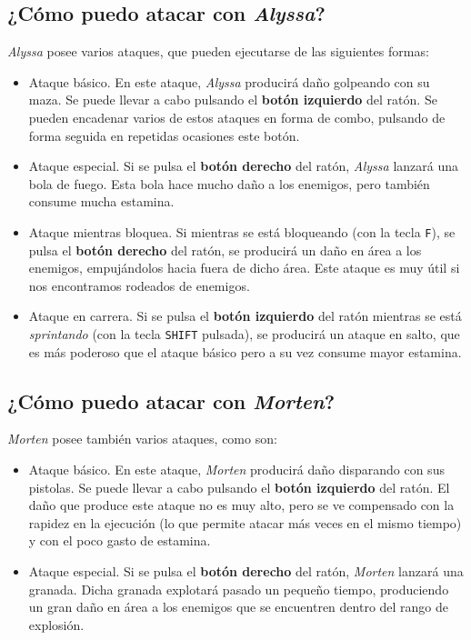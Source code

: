\subsection{¿Cómo puedo atacar con \textit{Alyssa}?}

\textit{Alyssa} posee varios ataques, que pueden ejecutarse de las siguientes formas:

\begin{itemize}
\item Ataque básico. En este ataque, \textit{Alyssa} producirá daño golpeando con su maza. Se puede llevar a cabo pulsando el \textbf{botón izquierdo} del ratón. Se pueden encadenar varios de estos ataques en forma de combo, pulsando de forma seguida en repetidas ocasiones este botón.
\item Ataque especial. Si se pulsa el \textbf{botón derecho} del ratón, \textit{Alyssa} lanzará una bola de fuego. Esta bola hace mucho daño a los enemigos, pero también consume mucha estamina.
\item Ataque mientras bloquea. Si mientras se está bloqueando (con la tecla \texttt{F}), se pulsa el \textbf{botón derecho} del ratón, se producirá un daño en área a los enemigos, empujándolos hacia fuera de dicho área. Este ataque es muy útil si nos encontramos rodeados de enemigos.
\item Ataque en carrera. Si se pulsa el \textbf{botón izquierdo} del ratón mientras se está \textit{sprintando} (con la tecla \texttt{SHIFT} pulsada), se producirá un ataque en salto, que es más poderoso que el ataque básico pero a su vez consume mayor estamina.
\end{itemize}

\subsection{¿Cómo puedo atacar con \textit{Morten}?}

\textit{Morten} posee también varios ataques, como son:

\begin{itemize}
\item Ataque básico. En este ataque, \textit{Morten} producirá daño disparando con sus pistolas. Se puede llevar a cabo pulsando el \textbf{botón izquierdo} del ratón. El daño que produce este ataque no es muy alto, pero se ve compensado con la rapidez en la ejecución (lo que permite atacar más veces en el mismo tiempo) y con el poco gasto de estamina.
\item Ataque especial. Si se pulsa el \textbf{botón derecho} del ratón, \textit{Morten} lanzará una granada. Dicha granada explotará pasado un pequeño tiempo, produciendo un gran daño en área a los enemigos que se encuentren dentro del rango de explosión.
\end{itemize}

